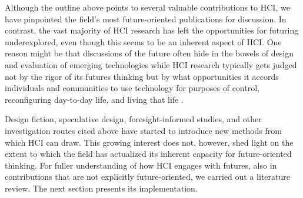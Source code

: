Although the outline above points to several valuable contributions to HCI, we have pinpointed the field's most future-oriented publications for discussion. 
In contrast, the vast majority of HCI research has left the opportunities for futuring underexplored, even though this seems to be an inherent aspect of HCI. One reason might be that discussions of the future often hide in the bowels of design and evaluation of emerging technologies while HCI research typically gets judged not by the rigor of its futures thinking but by what opportunities it accords individuals and communities to use technology for purposes of control, reconfiguring day-to-day life, and living that life \cite{bodkerWhenSecondWave2006}.

Design fiction, speculative design, foresight-informed studies, and other investigation routes cited above have started to introduce new methods from which HCI can draw. This growing interest does not, however, shed light on the extent to which the field has actualized its inherent capacity for future-oriented thinking. 
For fuller understanding of how HCI engages with futures, also in contributions that are not explicitly future-oriented, we carried out a literature review. The next section presents its implementation.